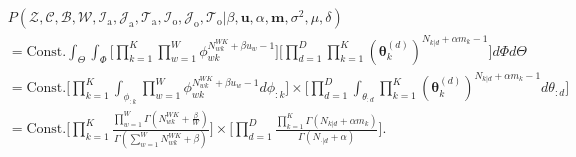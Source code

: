 \documentclass[a4paper]{article}
\begin{document}
  \begin{equation}
  \begin{aligned}
  &P(\mathcal{Z}, \mathcal{C}, \mathcal{B}, \mathcal{W}, \mathcal{I}_{\mbox{a}}, \mathcal{J}_{\mbox{a}}, \mathcal{T}_{\mbox{a}}, \mathcal{I}_{\mbox{o}}, \mathcal{J}_{\mbox{o}}, \mathcal{T}_{\mbox{o}}| \beta, \boldsymbol{u}, \alpha, \boldsymbol{m}, \sigma^2, \mu, \delta)\\&=\mbox{Const.}\int_{\Theta}\int_{\Phi}\Big[\prod_{k=1}^{K}\prod_{w=1}^{W}\phi_{wk}^{N^{WK}_{wk}+\beta u_w-1}\Big]\Big[\prod_{d=1}^{D}\prod_{k=1}^{K}(\boldsymbol{\theta}^{(d)}_{k})^{N_{k|d}+\alpha m_k-1}\Big]d\Phi d\Theta
  \\&=\mbox{Const.}\Big[\prod_{k=1}^{K}\int_{\phi_{:k}}\prod_{w=1}^{W}\phi_{wk}^{N^{WK}_{wk}+\beta u_w-1  }d\phi_{:k}\Big]\times\Big[\prod_{d=1}^{D}\int_{\theta_{:d}}\prod_{k=1}^{K}(\boldsymbol{\theta}^{(d)}_{k})^{N_{k|d}+\alpha m_k-1}d\theta_{:d}\Big]
  \\&=\mbox{Const.}\Big[\prod_{k=1}^{K}\frac{\prod_{w=1}^W\Gamma(N_{wk}^{WK}+\frac{\beta}{W})}{\Gamma(\sum_{w=1}^WN_{wk}^{WK}+\beta )}\Big]\times\Big[\prod_{d=1}^{D}\frac{\prod_{k=1}^K\Gamma(N_{k|d}+\alpha m_k)}{\Gamma(N_{\cdot|d}+\alpha)}\Big].
  \end{aligned}
  \end{equation}
\end{document}
